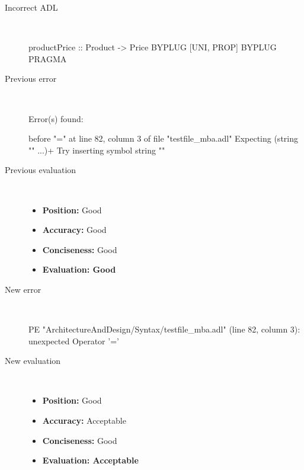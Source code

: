 \hrulefill

\begin{description}
  \item[Incorrect ADL]~\\
\begin{adl}
productPrice :: Product -> Price BYPLUG [UNI, PROP] BYPLUG PRAGMA\end{adl}
  \item[Previous error]~\\
\begin{haskell}
Error(s) found:

before "=" at line 82, column 3 of file "testfile_mba.adl"
Expecting (string "" ...)+
Try inserting symbol string ""\end{haskell}
  \item[Previous evaluation]~\\
    \begin{itemize}
    \item \textbf{Position:} Good
    \item \textbf{Accuracy:} Good
    \item \textbf{Conciseness:} Good
    \item \textbf{Evaluation: Good}
    \end{itemize}
  \item[New error]~\\
\begin{haskell}
PE "ArchitectureAndDesign/Syntax/testfile_mba.adl" (line 82, column 3):
unexpected Operator '='\end{haskell}
  \item[New evaluation]~\\
    \begin{itemize}
    \item \textbf{Position:} Good
    \item \textbf{Accuracy:} Acceptable
    \item \textbf{Conciseness:} Good
    \item \textbf{Evaluation: Acceptable}
    \end{itemize}
  \end{description}

\hrulefill

